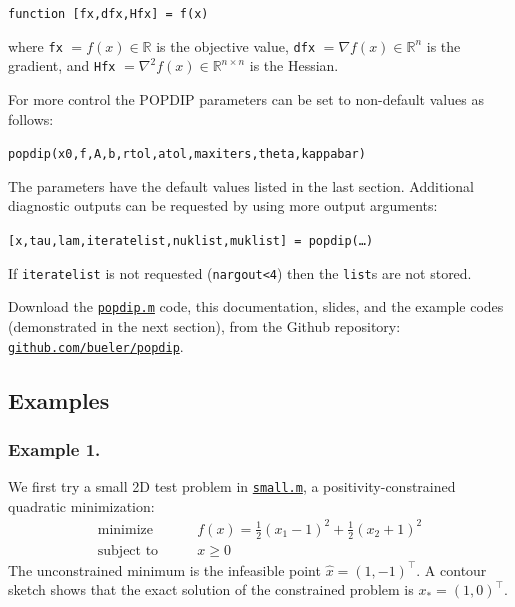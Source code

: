 \documentclass[11pt]{article}
\newcommand{\RR}{\mathbb{R}}
\newcommand{\grad}{\nabla}
\begin{document}
\medskip
\centerline{\texttt{function [fx,dfx,Hfx] = f(x)}}

\medskip
\noindent where \texttt{fx} $=f(x) \in\RR$ is the objective value, \texttt{dfx} $=\grad f(x) \in\RR^n$ is the gradient, and \texttt{Hfx} $= \grad^2 f(x) \in\RR^{n\times n}$ is the Hessian.

For more control the POPDIP parameters can be set to non-default values as follows:

\medskip
\centerline{\texttt{popdip(x0,f,A,b,rtol,atol,maxiters,theta,kappabar)}}

\medskip
\noindent The parameters have the default values listed in the last section.  Additional diagnostic outputs can be requested by using more output arguments:

\medskip
\centerline{\texttt{[x,tau,lam,iteratelist,nuklist,muklist] = popdip(\dots)}}

\medskip
\noindent If \texttt{iteratelist} is not requested (\texttt{nargout<4}) then the \texttt{list}s are not stored.

Download the \href{https://github.com/bueler/popdip/blob/main/matlab/popdip.m}{\texttt{popdip.m}} code, this documentation, slides, and the example codes (demonstrated in the next section), from the Github repository:\, \href{https://github.com/bueler/popdip}{\texttt{github.com/bueler/popdip}}.


\subsection*{Examples}

\subsubsection*{Example 1.}

We first try a small 2D test problem in \href{https://github.com/bueler/popdip/blob/main/matlab/small.m}{\texttt{small.m}}, a positivity-constrained quadratic minimization:
\begin{equation}
\begin{matrix}
\text{minimize} \qquad & f(x) = \frac{1}{2} (x_1-1)^2 + \frac{1}{2} (x_2+1)^2 \\
\text{subject to} \qquad & x \ge 0
\end{matrix} \label{eq:smallproblem}
\end{equation}
The unconstrained minimum is the infeasible point $\hat x =(1,-1)^\top$.  A contour sketch shows that the exact solution of the constrained problem is $x_*=(1,0)^\top$.
\end{document}
